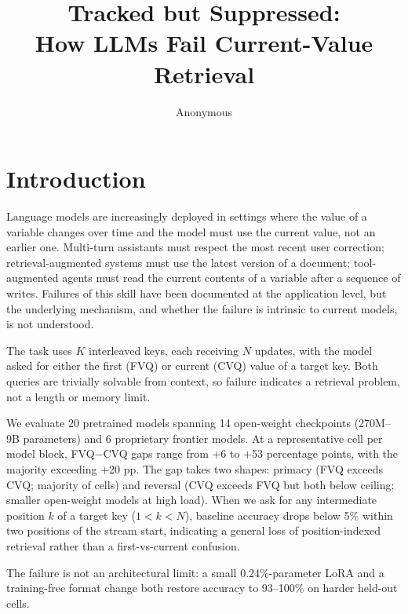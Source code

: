 \documentclass[11pt]{article}
\title{Tracked but Suppressed:\\
How LLMs Fail Current-Value Retrieval}
\author{Anonymous}
\begin{document}
\maketitle
\linenumbers

\section{Introduction}

Language models are increasingly deployed in settings where the value
of a variable changes over time and the model must use the current
value, not an earlier one.
Multi-turn assistants must respect the most recent user correction;
retrieval-augmented systems must use the latest version of a document;
tool-augmented agents must read the current contents of a variable
after a sequence of writes.
Failures of this skill have been documented at the application level,
but the underlying mechanism, and whether the failure is intrinsic to
current models, is not understood.

The task uses $K$ interleaved keys, each receiving $N$ updates, with
the model asked for either the first (FVQ) or current (CVQ) value of
a target key. Both queries are trivially solvable from context, so
failure indicates a retrieval problem, not a length or memory limit.

We evaluate 20 pretrained models spanning 14 open-weight checkpoints
(270M--9B parameters) and 6 proprietary frontier models.
At a representative cell per model block, FVQ$-$CVQ gaps range from
+6 to +53 percentage points, with the majority exceeding +20 pp.
The gap takes two shapes: primacy (FVQ exceeds CVQ; majority of
cells) and reversal (CVQ exceeds FVQ but both below ceiling; smaller
open-weight models at high load).
When we ask for any intermediate position $k$ of a target key
($1 < k < N$), baseline accuracy drops below 5\% within two positions
of the stream start, indicating a general loss of position-indexed
retrieval rather than a first-vs-current confusion.

The failure is not an architectural limit: a small 0.24\%-parameter
LoRA and a training-free format change both restore accuracy to
93--100\% on harder held-out cells.
\end{document}
